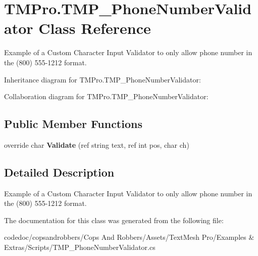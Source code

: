 \hypertarget{classTMPro_1_1TMP__PhoneNumberValidator}{}\section{T\+M\+Pro.\+T\+M\+P\+\_\+\+Phone\+Number\+Validator Class Reference}
\label{classTMPro_1_1TMP__PhoneNumberValidator}


Example of a Custom Character Input Validator to only allow phone number in the (800) 555-\/1212 format.  




Inheritance diagram for T\+M\+Pro.\+T\+M\+P\+\_\+\+Phone\+Number\+Validator\+:


Collaboration diagram for T\+M\+Pro.\+T\+M\+P\+\_\+\+Phone\+Number\+Validator\+:
\subsection*{Public Member Functions}
\begin{DoxyCompactItemize}
\item 
\mbox{\label{classTMPro_1_1TMP__PhoneNumberValidator_a7a812e1204c678ea3cf3258428a2b36f}} 
override char {\bfseries Validate} (ref string text, ref int pos, char ch)
\end{DoxyCompactItemize}


\subsection{Detailed Description}
Example of a Custom Character Input Validator to only allow phone number in the (800) 555-\/1212 format. 



The documentation for this class was generated from the following file\+:\begin{DoxyCompactItemize}
\item 
codedoc/copsandrobbers/\+Cops And Robbers/\+Assets/\+Text\+Mesh Pro/\+Examples \& Extras/\+Scripts/T\+M\+P\+\_\+\+Phone\+Number\+Validator.\+cs\end{DoxyCompactItemize}
